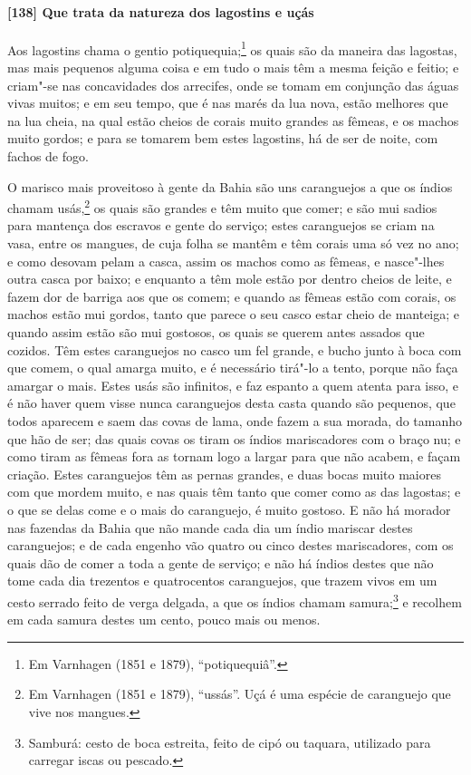 \begin{linenumbers}
\paragraph{[138] Que trata da natureza dos lagostins e uçás}\quad
Aos lagostins chama o gentio potiquequia;\footnote{ Em Varnhagen (1851 e 1879),
``potiquequiâ''.} os quais são da maneira das lagostas, mas mais pequenos alguma coisa e
em tudo o mais têm a mesma feição e feitio; e criam"-se nas concavidades dos arrecifes,
onde se tomam em conjunção das águas vivas muitos; e em seu tempo, que é nas marés da lua
nova, estão melhores que na lua cheia, na qual estão cheios de corais muito grandes as
fêmeas, e os machos muito gordos; e para se tomarem bem estes lagostins, há de ser de
noite, com fachos de fogo.

O marisco mais proveitoso à gente da Bahia são uns caranguejos a que os índios chamam
usás,\footnote{ Em Varnhagen (1851 e 1879), ``ussás''. Uçá é uma espécie de caranguejo que
vive nos mangues.} os quais são grandes e têm muito que comer; e são mui sadios para
mantença dos escravos e gente do serviço; estes caranguejos se criam na vasa, entre os
mangues, de cuja folha se mantêm e têm corais uma só vez no ano; e como desovam pelam a
casca, assim os machos como as fêmeas, e nasce"-lhes outra casca por baixo; e enquanto a
têm mole estão por dentro cheios de leite, e fazem dor de barriga aos que os comem; e
quando as fêmeas estão com corais, os machos estão mui gordos, tanto que parece o seu
casco estar cheio de manteiga; e quando assim estão são mui gostosos, os quais se querem
antes assados que cozidos. Têm estes caranguejos no casco um fel grande, e bucho junto à
boca com que comem, o qual amarga muito, e é necessário tirá"-lo a tento, porque não faça
amargar o mais. Estes usás são infinitos, e faz espanto a quem atenta para isso, e é não
haver quem visse nunca caranguejos desta casta quando são pequenos, que todos aparecem e
saem das covas de lama, onde fazem a sua morada, do tamanho que hão de ser; das quais
covas os tiram os índios mariscadores com o braço nu; e como tiram as fêmeas fora as
tornam logo a largar para que não acabem, e façam criação. Estes caranguejos têm as pernas
grandes, e duas bocas muito maiores com que mordem muito, e nas quais têm tanto que comer
como as das lagostas; e o que se delas come e o mais do caranguejo, é muito gostoso. E não
há morador nas fazendas da Bahia que não mande cada dia um índio mariscar destes
caranguejos; e de cada engenho vão quatro ou cinco destes mariscadores, com os quais dão
de comer a toda a gente de serviço; e não há índios destes que não tome cada dia trezentos
e quatrocentos caranguejos, que trazem vivos em um cesto serrado feito de verga delgada, a
que os índios chamam samura;\footnote{ Samburá: cesto de boca estreita, feito de cipó ou
taquara, utilizado para carregar iscas ou pescado.} e recolhem em cada samura destes um
cento, pouco mais ou menos.


\end{linenumbers}
